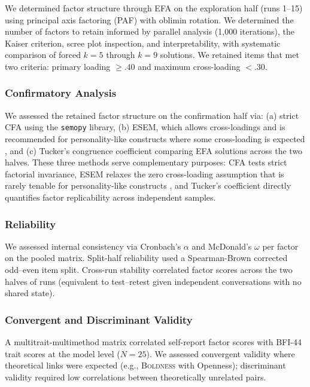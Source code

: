 \documentclass[11pt]{article}
\newcommand{\factorname}[1]{\textsc{#1}}
\newcommand{\nmodels}{25}
\begin{document}
We determined factor structure through EFA on the exploration half (runs 1--15) using principal axis factoring (PAF) with oblimin rotation.
We determined the number of factors to retain informed by parallel analysis (1{,}000 iterations), the Kaiser criterion, scree plot inspection, and interpretability, with systematic comparison of forced $k = 5$ through $k = 9$ solutions.
We retained items that met two criteria: primary loading $\geq .40$ and maximum cross-loading $< .30$.

\subsubsection{Confirmatory Analysis}
\label{sec:cfa-plan}

We assessed the retained factor structure on the confirmation half via:
(a) strict CFA using the \texttt{semopy} library,
(b) ESEM, which allows cross-loadings and is recommended for personality-like constructs where some cross-loading is expected \citep{marsh2014exploratory}, and
(c) Tucker's congruence coefficient comparing EFA solutions across the two halves.
These three methods serve complementary purposes: CFA tests strict factorial invariance, ESEM relaxes the zero cross-loading assumption that is rarely tenable for personality-like constructs \citep{marsh2014exploratory}, and Tucker's coefficient directly quantifies factor replicability across independent samples.

\subsubsection{Reliability}
\label{sec:reliability-plan}

We assessed internal consistency via Cronbach's $\alpha$ and McDonald's $\omega$ per factor on the pooled matrix.
Split-half reliability used a Spearman-Brown corrected odd--even item split.
Cross-run stability correlated factor scores across the two halves of runs (equivalent to test--retest given independent conversations with no shared state).

\subsubsection{Convergent and Discriminant Validity}
\label{sec:convergent-plan}

A multitrait-multimethod matrix correlated self-report factor scores with BFI-44 trait scores at the model level ($N = \nmodels{}$).
We assessed convergent validity where theoretical links were expected (e.g., \factorname{Boldness} with Openness);
discriminant validity required low correlations between theoretically unrelated pairs.
\end{document}
